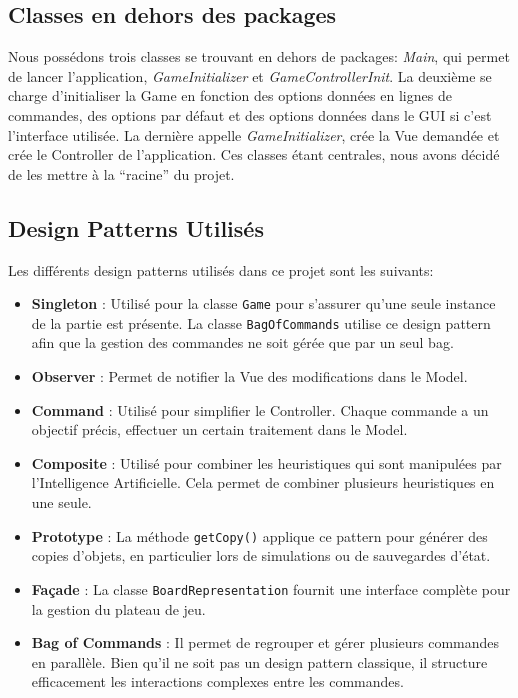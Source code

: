 \documentclass{article}
\begin{document}
\subsection{Classes en dehors des packages}
Nous possédons trois classes se trouvant en dehors de packages: \textit{Main}, qui permet de lancer l'application, 
\textit{GameInitializer} et \textit{GameControllerInit}. La deuxième se charge d'initialiser la Game en fonction des options données en lignes de commandes, des options par défaut
et des options données dans le GUI si c'est l'interface utilisée. La dernière appelle \textit{GameInitializer}, crée la Vue demandée et crée le Controller de l'application.
Ces classes étant centrales, nous avons décidé de les mettre à la ``racine'' du projet.
\subsection{Design Patterns Utilisés}

Les différents design patterns utilisés dans ce projet sont les suivants:
\begin{itemize}
    \item \textbf{Singleton} : Utilisé pour la classe \texttt{Game} pour s'assurer qu'une seule instance de la partie est présente.
    La classe \texttt{BagOfCommands} utilise ce design pattern afin que la gestion des commandes ne soit gérée que par un seul bag.
    \item \textbf{Observer} : Permet de notifier la Vue des modifications dans le Model.
    \item \textbf{Command} : Utilisé pour simplifier le Controller. Chaque commande a un objectif précis, effectuer un certain traitement dans le Model.
    \item \textbf{Composite} : Utilisé pour combiner les heuristiques qui sont manipulées par l'Intelligence Artificielle. Cela permet de combiner plusieurs heuristiques en une seule.
    \item \textbf{Prototype} : La méthode \texttt{getCopy()} applique ce pattern pour générer des copies d’objets, en particulier lors de simulations ou de sauvegardes d’état.
    \item \textbf{Façade} : La classe \texttt{BoardRepresentation} fournit une interface complète pour la gestion du plateau de jeu.
    \item \textbf{Bag of Commands} : Il permet de regrouper
    et gérer plusieurs commandes en parallèle. Bien qu’il ne soit pas un design pattern
    classique, il structure efficacement les interactions complexes entre les commandes.
\end{itemize}
\end{document}
